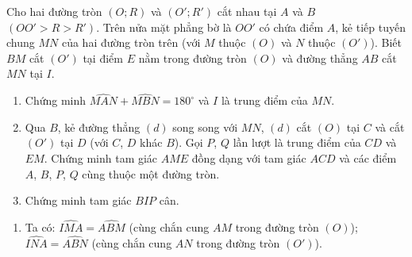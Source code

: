 \begin{ex}%
    Cho hai đường tròn $(O;R)$ và $(O';R')$ cắt nhau tại $A$ và $B$ $(OO'>R>R')$. Trên nửa mặt phẳng bờ là $OO'$ có chứa điểm $A$, kẻ tiếp tuyến chung $MN$ của hai đường tròn trên (với $M$ thuộc $(O)$ và $N$ thuộc $(O')$). Biết $BM$ cắt $(O')$ tại điểm $E$ nằm trong đường tròn $(O)$ và đường thẳng $AB$ cắt $MN$ tại $I$.
    \begin{enumerate}
        \item Chứng minh $\widehat{MAN}+\widehat{MBN}=180^\circ$ và $I$ là trung điểm của $MN$.
        \item Qua $B$, kẻ đường thẳng $(d)$ song song với $MN$, $(d)$ cắt $(O)$ tại $C$ và cắt $(O')$ tại $D$ (với $C$, $D$ khác $B$). Gọi $P$, $Q$ lần lượt là trung điểm của $CD$ và $EM$. Chứng minh tam giác $AME$ đồng dạng với tam giác $ACD$ và các điểm $A$, $B$, $P$, $Q$ cùng thuộc một đường tròn.
        \item Chứng minh tam giác $BIP$ cân.        
    \end{enumerate}
\loigiai
    {
    \begin{center}
    \end{center}
    \begin{enumerate}
        \item Ta có: $\widehat{IMA}=\widehat{ABM}$ (cùng chắn cung $AM$ trong đường tròn $(O)$); $\widehat{INA}=\widehat{ABN}$ (cùng chắn cung $AN$ trong đường tròn $(O')$).\\

\end{enumerate}}
\end{ex}
